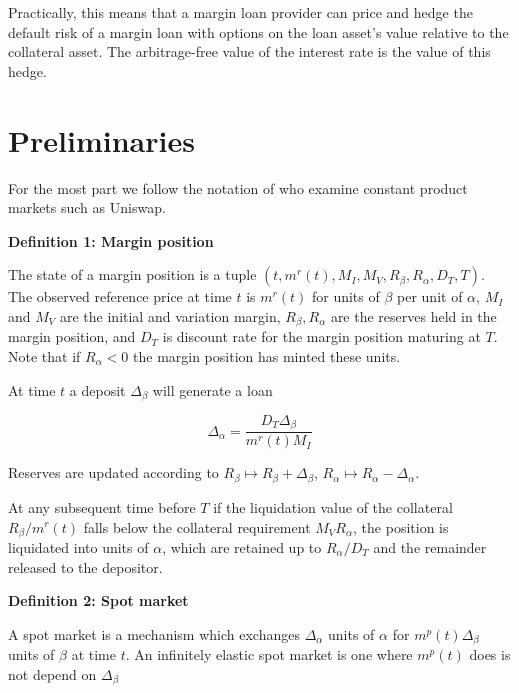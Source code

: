 \documentclass[12pt]{article}
\begin{document}
Practically, this means that a margin loan provider can price and hedge the default risk of a margin loan with options on the loan asset's value relative to the collateral asset. The arbitrage-free value of the interest rate is the value of this hedge.

\section{Preliminaries}

For the most part we follow the notation of \cite{ang20} who examine constant product markets such as Uniswap.

\textbf{Definition 1: Margin position}


The state of a margin position is a tuple $(t, m^r(t), M_I, M_V, R_\beta, R_\alpha, D_T, T)$. The observed reference price at time $t$ is $m^r(t)$ for units of $\beta$ per unit of $\alpha$, $M_I$ and $M_V$ are the initial and variation margin, $R_\beta, R_\alpha$ are the reserves held in the margin position, and $D_T$ is discount rate for the margin position maturing at $T$. Note that if $R_\alpha<0$ the margin position has minted these units.

At time $t$ a deposit $\Delta_\beta$  will generate a loan 

\begin{equation} \label{Delta_alpha}
\Delta_\alpha = \frac{D_T \Delta_\beta}{m^r(t) M_I }
\end{equation}


Reserves are updated according to $R_\beta \mapsto R_\beta + \Delta_\beta$, $R_\alpha \mapsto R_\alpha - \Delta_\alpha$. 

At any subsequent time before $T$ if the liquidation value of the collateral $R_\beta/m^r(t)$ falls below the collateral requirement $M_V R_\alpha$, the position is liquidated into units of $\alpha$, which are retained up to $R_\alpha/D_T$ and the remainder released to the depositor.   

\textbf{Definition 2: Spot market}

A spot market is a mechanism which exchanges $\Delta_\alpha$ units of $\alpha$ for $m^p(t)\Delta_\beta$ units of $\beta$ at time $t$. An infinitely elastic spot market is one where $m^p(t)$ does is not depend on $\Delta_\beta$
\end{document}

